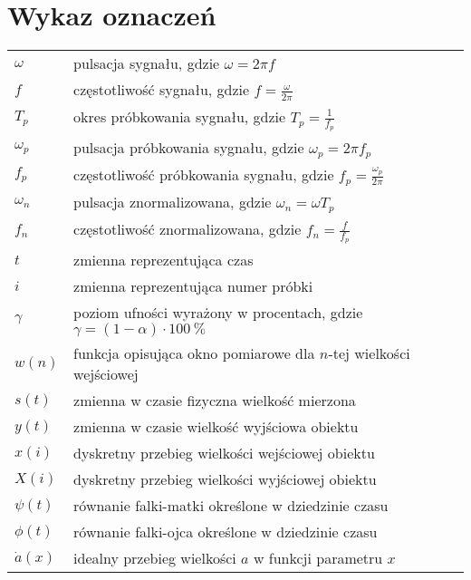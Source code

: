 \chapter*{Wykaz oznaczeń}

\begin{longtable}[l]{ l @{~~--~~} p{376pt} }
$\omega$                        & pulsacja sygnału, gdzie $\omega = 2\pi f$ \\
$f$                             & częstotliwość sygnału, gdzie $f = \frac{\omega}{2\pi}$ \\
$T_{p}$                         & okres próbkowania sygnału, gdzie $T_{p} = \frac{1}{f_{p}}$ \\
$\omega_{p}$                    & pulsacja próbkowania sygnału, gdzie $\omega_{p} = 2\pi f_{p}$ \\
$f_{p}$                         & częstotliwość próbkowania sygnału, gdzie $f_{p} = \frac{\omega_{p}}{2\pi}$ \\
$\omega_{n}$                    & pulsacja znormalizowana, gdzie $\omega_{n} = \omega T_{p}$ \\
$f_{n}$                         & częstotliwość znormalizowana, gdzie $f_{n} = \frac{f}{f_{p}}$ \\
$t$                             & zmienna reprezentująca czas \\
$i$                             & zmienna reprezentująca numer próbki \\
$\gamma$                        & poziom ufności wyrażony w procentach, gdzie $\gamma = (1 - \alpha) \cdot \qty{100}{\percent}$ \\
$w(n)$                          & funkcja opisująca okno pomiarowe dla $n$-tej wielkości wejściowej \\
$s(t)$                          & zmienna w czasie fizyczna wielkość mierzona \\
$y(t)$                          & zmienna w czasie wielkość wyjściowa obiektu \\
$x(i)$                          & dyskretny przebieg wielkości wejściowej obiektu \\
$X(i)$                          & dyskretny przebieg wielkości wyjściowej obiektu \\
$\psi(t)$                       & równanie falki-matki określone w dziedzinie czasu \\
$\phi(t)$                       & równanie falki-ojca określone w dziedzinie czasu \\
$\dot{a}(x)$                    & idealny przebieg wielkości $a$ w funkcji parametru $x$ \\

\end{longtable}
